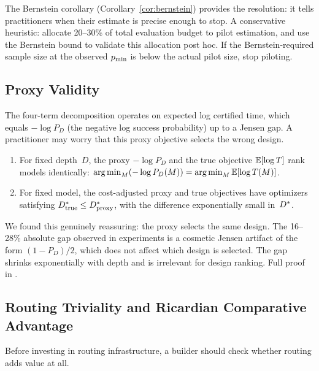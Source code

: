The Bernstein corollary (Corollary~\ref{cor:bernstein}) provides the resolution: it tells practitioners when their estimate is precise enough to stop.
A conservative heuristic: allocate 20--30\% of total evaluation budget to pilot estimation, and use the Bernstein bound to validate this allocation post hoc.
If the Bernstein-required sample size at the observed $p_{\min}$ is below the actual pilot size, stop piloting.

\subsection{Proxy Validity}
\label{sec:proxy-validity}

The four-term decomposition operates on expected log certified time, which equals $-\log P_D$ (the negative log success probability) up to a Jensen gap.
A practitioner may worry that this proxy objective selects the wrong design.

\begin{theorem}
\label{thm:proxy-validity}
\begin{enumerate}[label=(\alph*)]
  \item For fixed depth~$D$, the proxy $-\log P_D$ and the true objective $\mathbb{E}[\log T]$ rank models identically: $\operatorname*{arg\,min}_M (-\log P_D(M)) = \operatorname*{arg\,min}_M \mathbb{E}[\log T(M)]$.
  \item For fixed model, the cost-adjusted proxy and true objectives have optimizers satisfying $D^*_{\mathrm{true}} \le D^*_{\mathrm{proxy}}$, with the difference exponentially small in~$D^*$.
\end{enumerate}
\end{theorem}

We found this genuinely reassuring: the proxy selects the same design.
The 16--28\% absolute gap observed in experiments is a cosmetic Jensen artifact of the form $(1-P_D)/2$, which does not affect which design is selected.
The gap shrinks exponentially with depth and is irrelevant for design ranking.
Full proof in .

\subsection{Routing Triviality and Ricardian Comparative Advantage}
\label{sec:routing-triviality}

Before investing in routing infrastructure, a builder should check whether routing adds value at all.

